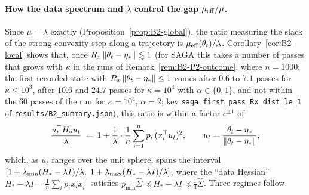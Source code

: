 \paragraph{How the data spectrum and $\lambda$ control the gap $\mu_{\mathrm{eff}}/\mu$.}
Since $\mu=\lambda$ exactly (Proposition~\ref{prop:B2-global}), the ratio measuring the slack of the
strong-convexity step along a trajectory is $\mu_{\mathrm{eff}}(\theta_t)/\lambda$. Corollary~\ref{cor:B2-local} shows
that, once $R_x\left\|\theta_t-\eta_\ast\right\|\lesssim1$ (for SAGA this takes a number of passes that grows with $\kappa$ in
the runs of Remark~\ref{rem:B2-P2-outcome}, where $n=1000$: the first recorded state with $R_x\left\|\theta_t-\eta_\ast\right\|\le1$
comes after $0.6$ to $7.1$ passes for $\kappa\le10^3$, after $10.6$ and $24.7$ passes for $\kappa=10^4$ with
$\alpha\in\{0,1\}$, and not within the $60$ passes of the run for $\kappa=10^4$, $\alpha=2$; key
\texttt{saga\_first\_pass\_Rx\_dist\_le\_1} of \texttt{results/B2\_summary.json}), this
ratio is within a factor $e^{\pm1}$ of
\begin{equation}\label{eq:B2-gap-direction}
\frac{u_t^\top H_\ast u_t}{\lambda}\;=\;1+\frac1\lambda\cdot\frac1n\sum_{i=1}^np_i\,(x_i^\top u_t)^2,
\qquad u_t=\frac{\theta_t-\eta_\ast}{\left\|\theta_t-\eta_\ast\right\|},
\end{equation}
which, as $u_t$ ranges over the unit sphere, spans the interval
$[1+\lambda_{\min}(H_\ast-\lambda I)/\lambda,\;1+\lambda_{\max}(H_\ast-\lambda I)/\lambda]$, where the ``data Hessian''
$H_\ast-\lambda I=\frac1n\sum_ip_ix_ix_i^\top$ satisfies $p_{\min}\hat\Sigma\preccurlyeq H_\ast-\lambda I\preccurlyeq\frac14\hat\Sigma$.
Three regimes follow.
